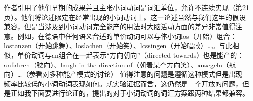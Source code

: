 \begin{exe}
\begin{xlist}[iv.]
\begin{exe}
\begin{xlist}[iv.]
作者引用了他们早期的成果\citep*{CSP2010a}并且主张小词动词是词汇单位，允许不连续实现（第21页）。他们将论述限定在经常出现的小词动词上。这一论述当然与我们这里的假设兼容，但是当涉及到小词动词完全能产的用法时大脑活动方面的差异非常值得注意。例如，在德语中任何语义合适的单价动词可以与体小词los（开始）组合：lostanzen（开始跳舞）、loslachen（开始笑）、lossingen（开始唱歌）\ldots。与此相似，单价动词与an组合在一起表示“方向朝向”（directed-towards）也是能产的：anfahren（驶向）、laugh in the direction of（朝着某个方向笑）、ansegeln（航向）\ldots{}（参看对多种能产模式的讨论）
值得注意的问题是遵循这种模式但是出现频率比较低的小词动词表现如何。就实验证据而言，这仍然是一个开放的问题，但是正如我下面要进行论证的，\citet{Mueller2003a}提出的对于小词动词的词汇方案跟两种结果都兼容。


\end{xlist}
\end{exe}
\end{xlist}
\end{exe}
